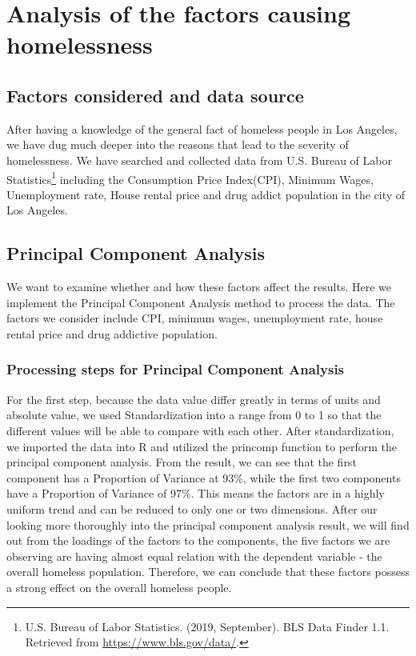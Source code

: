 \documentclass[]{article}
\let\rmarkdownfootnote\footnote%
\def\footnote{\protect\rmarkdownfootnote}
\begin{document}
\hypertarget{analysis-of-the-factors-causing-homelessness}{%
\section{Analysis of the factors causing
homelessness}\label{analysis-of-the-factors-causing-homelessness}}

\hypertarget{factors-considered-and-data-source}{%
\subsection{Factors considered and data
source}\label{factors-considered-and-data-source}}

After having a knowledge of the general fact of homeless people in Los
Angeles, we have dug much deeper into the reasons that lead to the
severity of homelessness. We have searched and collected data from U.S.
Bureau of Labor Statistics\footnote{U.S. Bureau of Labor Statistics.
  (2019, September). BLS Data Finder 1.1. Retrieved from
  \url{https://www.bls.gov/data/}.} including the Consumption Price
Index(CPI), Minimum Wages, Unemployment rate, House rental price and
drug addict population in the city of Los Angeles.

\hypertarget{principal-component-analysis}{%
\subsection{Principal Component
Analysis}\label{principal-component-analysis}}

We want to examine whether and how these factors affect the results.
Here we implement the Principal Component Analysis method to process the
data. The factors we consider include CPI, minimum wages, unemployment
rate, house rental price and drug addictive population.

\hypertarget{processing-steps-for-principal-component-analysis}{%
\subsubsection{Processing steps for Principal Component
Analysis}\label{processing-steps-for-principal-component-analysis}}

For the first step, because the data value differ greatly in terms of
units and absolute value, we used Standardization into a range from 0 to
1 so that the different values will be able to compare with each other.
After standardization, we imported the data into R and utilized the
princomp function to perform the principal component analysis. From the
result, we can see that the first component has a Proportion of Variance
at 93\%, while the first two components have a Proportion of Variance of
97\%. This means the factors are in a highly uniform trend and can be
reduced to only one or two dimensions. After our looking more thoroughly
into the principal component analysis result, we will find out from the
loadings of the factors to the components, the five factors we are
observing are having almost equal relation with the dependent variable -
the overall homeless population. Therefore, we can conclude that these
factors possess a strong effect on the overall homeless people.
\end{document}
